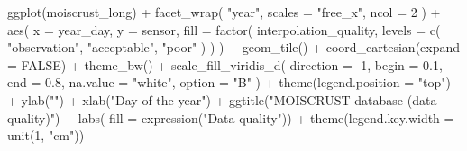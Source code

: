 \documentclass[
  table]{article}
\newenvironment{Shaded}{\begin{snugshade}}{\end{snugshade}}
\newcommand{\AttributeTok}[1]{\textcolor[rgb]{0.77,0.63,0.00}{#1}}
\newcommand{\ConstantTok}[1]{\textcolor[rgb]{0.00,0.00,0.00}{#1}}
\newcommand{\DecValTok}[1]{\textcolor[rgb]{0.00,0.00,0.81}{#1}}
\newcommand{\FloatTok}[1]{\textcolor[rgb]{0.00,0.00,0.81}{#1}}
\newcommand{\FunctionTok}[1]{\textcolor[rgb]{0.00,0.00,0.00}{#1}}
\newcommand{\NormalTok}[1]{#1}
\newcommand{\SpecialCharTok}[1]{\textcolor[rgb]{0.00,0.00,0.00}{#1}}
\newcommand{\StringTok}[1]{\textcolor[rgb]{0.31,0.60,0.02}{#1}}
\begin{document}
\begin{Shaded}
\begin{Highlighting}[]
\FunctionTok{ggplot}\NormalTok{(moiscrust\_long) }\SpecialCharTok{+} 
  \FunctionTok{facet\_wrap}\NormalTok{(}
    \StringTok{"year"}\NormalTok{, }
    \AttributeTok{scales =} \StringTok{"free\_x"}\NormalTok{, }
    \AttributeTok{ncol =} \DecValTok{2}
\NormalTok{    ) }\SpecialCharTok{+}
  \FunctionTok{aes}\NormalTok{(}
    \AttributeTok{x =}\NormalTok{ year\_day, }
    \AttributeTok{y =}\NormalTok{ sensor, }
    \AttributeTok{fill =} \FunctionTok{factor}\NormalTok{(}
\NormalTok{      interpolation\_quality, }
      \AttributeTok{levels =} \FunctionTok{c}\NormalTok{(}
        \StringTok{"observation"}\NormalTok{, }
        \StringTok{"acceptable"}\NormalTok{, }
        \StringTok{"poor"}
\NormalTok{        )}
\NormalTok{      )}
\NormalTok{    ) }\SpecialCharTok{+} 
  \FunctionTok{geom\_tile}\NormalTok{() }\SpecialCharTok{+} 
  \FunctionTok{coord\_cartesian}\NormalTok{(}\AttributeTok{expand =} \ConstantTok{FALSE}\NormalTok{) }\SpecialCharTok{+}
  \FunctionTok{theme\_bw}\NormalTok{() }\SpecialCharTok{+} 
  \FunctionTok{scale\_fill\_viridis\_d}\NormalTok{(}
    \AttributeTok{direction =} \SpecialCharTok{{-}}\DecValTok{1}\NormalTok{, }
    \AttributeTok{begin =} \FloatTok{0.1}\NormalTok{,}
    \AttributeTok{end =} \FloatTok{0.8}\NormalTok{, }
    \AttributeTok{na.value =} \StringTok{"white"}\NormalTok{, }
    \AttributeTok{option =} \StringTok{"B"}
\NormalTok{    ) }\SpecialCharTok{+}
  \FunctionTok{theme}\NormalTok{(}\AttributeTok{legend.position =} \StringTok{"top"}\NormalTok{) }\SpecialCharTok{+} 
  \FunctionTok{ylab}\NormalTok{(}\StringTok{""}\NormalTok{) }\SpecialCharTok{+} 
  \FunctionTok{xlab}\NormalTok{(}\StringTok{"Day of the year"}\NormalTok{) }\SpecialCharTok{+}
  \FunctionTok{ggtitle}\NormalTok{(}\StringTok{"MOISCRUST database (data quality)"}\NormalTok{) }\SpecialCharTok{+}
  \FunctionTok{labs}\NormalTok{(}
    \AttributeTok{fill =} \FunctionTok{expression}\NormalTok{(}\StringTok{"Data quality"}\NormalTok{)) }\SpecialCharTok{+} 
  \FunctionTok{theme}\NormalTok{(}\AttributeTok{legend.key.width =} \FunctionTok{unit}\NormalTok{(}\DecValTok{1}\NormalTok{, }\StringTok{"cm"}\NormalTok{))}
\end{Highlighting}
\end{Shaded}
\end{document}
